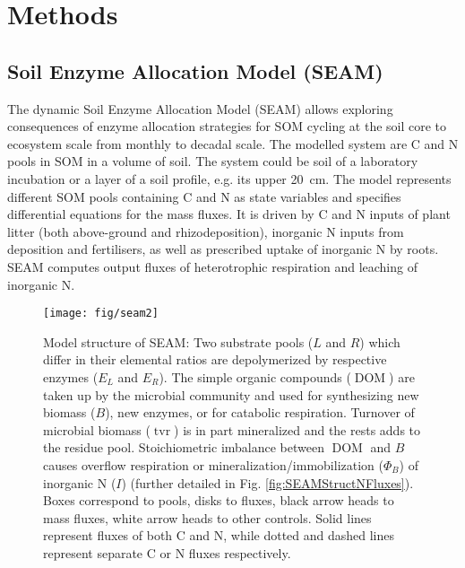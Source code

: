 \section{Methods}
\subsection{Soil Enzyme Allocation Model (SEAM)}
\label{sec:SEAM}

The dynamic Soil Enzyme Allocation Model (SEAM) allows exploring consequences of
enzyme allocation strategies for SOM cycling at the soil core to ecosystem
scale from monthly to decadal scale. The modelled system are C and N pools in
SOM in a volume of soil. The system could be soil of a
laboratory incubation or a layer of a soil profile, e.g. its upper 20~\unit{cm}.
The model represents different SOM pools containing C and N as state variables
and specifies differential equations for the mass fluxes. It is driven by C and
N inputs of plant litter (both above-ground and rhizodeposition), inorganic N
inputs from deposition and fertilisers, as well as prescribed uptake of
inorganic N by roots. SEAM computes output fluxes of heterotrophic respiration
and leaching of inorganic N.

\begin{figure}[t] \vspace*{2mm}
\begin{center}
\texttt{[image: fig/seam2]}
\end{center}
\caption{
Model structure of SEAM: Two substrate pools ($L$ and $R$) which differ in their
elemental ratios are depolymerized by respective enzymes ($E_L$ and $E_R$). The
simple organic compounds ($\operatorname{DOM}$) are taken up by the microbial
community  and used for synthesizing new biomass (${B}$), new enzymes, or for
catabolic respiration. Turnover of microbial biomass ($\operatorname{tvr}$) is
in part mineralized and the rests adds to the residue pool.
Stoichiometric imbalance between $\operatorname{DOM}$ and ${B}$ causes overflow
respiration or mineralization/immobilization ($\Phi_B$) of inorganic N ($I$)
(further detailed in Fig. \ref{fig:SEAMStructNFluxes}).
Boxes correspond to pools, disks to fluxes, black arrow heads to mass fluxes,
white arrow heads to other controls. Solid lines represent fluxes of both C and
N, while dotted and dashed lines represent separate C or N fluxes respectively.
\label{fig:SEAMStruct}
}
\end{figure} 

